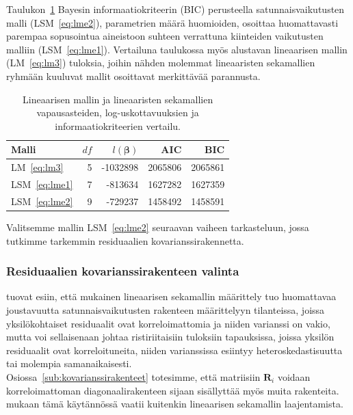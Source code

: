 \documentclass[finnish]{docopts}
\begin{document}
Taulukon~\ref{table:lme_summary} Bayesin informaatiokriteerin (BIC) perusteella satunnaisvaikutusten malli (LSM~\ref{eq:lme2}), parametrien määrä huomioiden, osoittaa huomattavasti parempaa sopusointua aineistoon suhteen verrattuna kiinteiden vaikutusten malliin (LSM~\ref{eq:lme1}). Vertailuna taulukossa myös alustavan lineaarisen mallin (LM~\ref{eq:lm3}) tuloksia, joihin nähden molemmat lineaaristen sekamallien ryhmään kuuluvat mallit osoittavat merkittävää parannusta. \\

\begin{table}[H]
\centering
\begin{tabular}{lrrrr}
\toprule
Malli & $df$ & $l(\bm{\beta})$ & AIC & BIC\\
\midrule
LM~\ref{eq:lm3} & 5 & -1032898 & 2065806 & 2065861\\
LSM~\ref{eq:lme1} & 7 & -813634 & 1627282 & 1627359\\
LSM~\ref{eq:lme2} & 9 & -729237 & 1458492 & 1458591\\
\bottomrule
\end{tabular}
\caption{Lineaarisen mallin ja lineaaristen sekamallien vapausasteiden, log-uskottavuuksien ja informaatiokriteerien vertailu.}
\label{table:lme_summary}
\end{table}

Valitsemme mallin LSM~\ref{eq:lme2} seuraavan vaiheen tarkasteluun, jossa tutkimme tarkemmin residuaalien kovarianssirakennetta.

\subsubsection{Residuaalien kovarianssirakenteen valinta}
\label{ssb:reskovar}

\cite{pinheiro00} tuovat esiin, että \cite{laird82} mukainen lineaarisen sekamallin määrittely tuo huomattavaa joustavuutta satunnaisvaikutusten rakenteen määrittelyyn tilanteissa, joissa yksilökohtaiset residuaalit ovat korreloimattomia ja niiden varianssi on vakio, mutta voi sellaisenaan johtaa ristiriitaisiin tuloksiin tapauksissa, joissa yksilön residuaalit ovat korreloituneita, niiden varianssissa esiintyy heteroskedastisuutta tai molempia samanaikaisesti.\\

Osiossa~\ref{sub:kovarianssirakenteet} totesimme, että matriisiin $\bm{R}_i$ voidaan korreloimattoman diagonaalirakenteen sijaan sisällyttää myös muita rakenteita. \cite{pinheiro00} mukaan tämä käytännössä vaatii kuitenkin lineaarisen sekamallin laajentamista.\\
\end{document}
